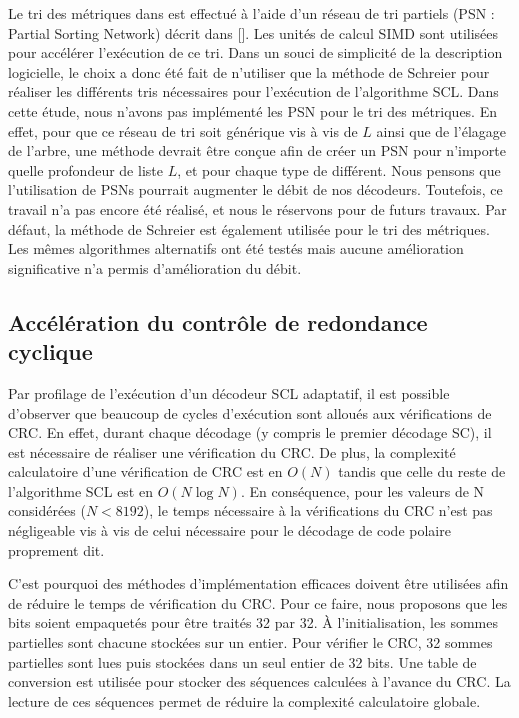 Le tri des métriques dans \cite{sarkis_fast_2016} est effectué à l'aide d'un réseau de tri partiels (PSN : Partial Sorting Network) décrit dans []. Les unités de calcul SIMD sont utilisées pour accélérer l'exécution de ce tri. 
Dans un souci de simplicité de la description logicielle, le choix a donc été fait de n'utiliser que la méthode de Schreier pour réaliser les différents tris nécessaires pour l'exécution de l'algorithme SCL.
Dans cette étude, nous n'avons pas implémenté les PSN pour le tri des métriques. En effet, pour que ce réseau de tri soit générique vis à vis de $L$ ainsi que de l'élagage de l'arbre, une méthode devrait être conçue afin de créer un PSN pour n'importe quelle profondeur de liste $L$, et pour chaque type de \noeud différent. Nous pensons que l'utilisation de PSNs pourrait augmenter le débit de nos décodeurs. Toutefois, ce travail n'a pas encore été réalisé, et nous le réservons pour de futurs travaux.
Par défaut, la méthode de Schreier est également utilisée pour le tri des métriques. Les mêmes algorithmes alternatifs ont été testés mais aucune amélioration significative n'a permis d'amélioration du débit.

\subsection{Accélération du contrôle de redondance cyclique}

Par profilage de l'exécution d'un décodeur SCL adaptatif, il est possible d'observer que beaucoup de cycles d'exécution sont alloués aux vérifications de CRC.
En effet, durant chaque décodage (y compris le premier décodage SC), il est nécessaire de réaliser une vérification du CRC.
De plus, la complexité calculatoire d'une vérification de CRC est en $O(N)$ tandis que celle du reste de l'algorithme SCL est en $O(N\log N)$.
En conséquence, pour les valeurs de N considérées ($N<8192$), le temps nécessaire à la vérifications du CRC n'est pas négligeable vis à vis de celui nécessaire pour le décodage de code polaire proprement dit.

C'est pourquoi des méthodes d'implémentation efficaces doivent être utilisées afin de réduire le temps de vérification du CRC.
Pour ce faire, nous proposons que les bits soient empaquetés pour être traités 32 par 32.
\`A l'initialisation, les sommes partielles sont chacune stockées sur un entier.
Pour vérifier le CRC, 32 sommes partielles sont lues puis stockées dans un seul entier de 32 bits.
Une table de conversion est utilisée pour stocker des séquences calculées à l'avance du CRC.
La lecture de ces séquences permet de réduire la complexité calculatoire globale.

